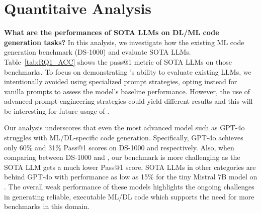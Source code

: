 
\setlength{\parskip}{0pt}

\section{Quantitaive Analysis}
\label{sec:study}



\textbf{What are the performances of SOTA LLMs on DL/ML code generation tasks?}
In this analysis, we investigate how the existing ML code generation benchmark (DS-1000) and \tool evaluate SOTA LLMs.
Table~\ref{tab:RQ1_ACC} shows the pass@1 metric of SOTA LLMs on those benchmarks.
To focus on 
demonstrating \tool's ability to evaluate existing LLMs, we intentionally avoided using specialized prompt strategies, opting instead for vanilla prompts to assess the model's baseline performance. However, the use of advanced prompt engineering strategies could yield different results and this will be interesting for future usage of \tool. 

Our analysis underscores that even the most advanced model such as GPT-4o struggles with ML/DL-specific code generation. Specifically, GPT-4o achieves only 60\% and 31\% Pass@1 scores on DS-1000 and \tool respectively. 
Also, when comparing between DS-1000 and \tool, our benchmark is more challenging as the SOTA LLM gets a much lower Pass@1 score, SOTA LLMs in other categories are behind GPT-4o with performance as low as 15\% for the tiny Mistral 7B model on \tool. The overall weak performance of these models highlights the ongoing challenges in generating reliable, executable ML/DL code which supports the need for more benchmarks in this domain.


